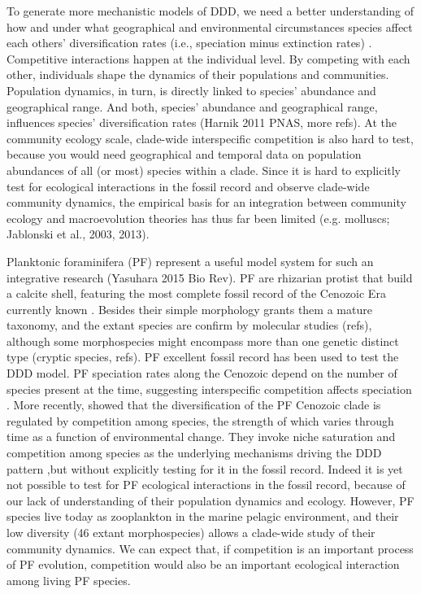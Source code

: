 \documentclass[a4paper]{article}
\begin{document}
To generate more mechanistic models of DDD, we need a better understanding of how and under what geographical and environmental circumstances species affect each others' diversification rates (i.e., speciation minus extinction rates) \citep{weber2017evolution}.  
Competitive interactions happen at the individual level. By competing with each other, individuals shape the dynamics of their populations and communities. Population dynamics, in turn, is directly linked to species' abundance and geographical range. And both, species' abundance and geographical range, influences species' diversification rates (Harnik 2011 PNAS, more refs). 
At the community ecology scale, clade-wide interspecific competition is also hard to test, because you would need geographical and temporal data on population abundances of all (or most) species within a clade. 
Since it is hard to explicitly test for ecological interactions in the fossil record and observe clade-wide community dynamics, the empirical basis for an integration between community ecology and macroevolution theories has thus far been limited (e.g. molluscs; Jablonski et al., 2003, 2013).



Planktonic foraminifera (PF) represent a useful model system for such an integrative research (Yasuhara 2015 Bio Rev). PF are rhizarian protist that build a calcite shell, featuring the most complete fossil record of the Cenozoic Era currently known \citep{kucera2007chapter, ezard2011interplay}. Besides their simple morphology grants them a mature taxonomy, and the extant species are confirm by molecular studies (refs), although some morphospecies might encompass more than one genetic distinct type (cryptic species, refs). 
PF excellent fossil record has been used to test the DDD model. PF speciation rates along the Cenozoic depend on the number of species present at the time, suggesting interspecific competition affects speciation \cite{ezard2011interplay}. %
More recently, \cite{ezard2016ecolet} showed that the diversification of the PF Cenozoic clade is regulated by competition among species, the strength of which varies through time as a function of environmental change. They invoke niche saturation and competition among species as the underlying mechanisms driving the DDD pattern ,but without explicitly testing for it in the fossil record.
Indeed it is yet not possible to test for PF ecological interactions in the fossil record, because of our lack of understanding of their population dynamics and ecology.
However, PF species live today as zooplankton in the marine pelagic environment, and their low diversity (46 extant morphospecies) allows a clade-wide study of their community dynamics.  
We can expect that, if competition is an important process of PF evolution, competition would also be an important ecological interaction among living PF species. 
\end{document}
